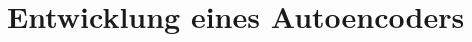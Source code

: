 \documentclass[../main]{subfiles}
\begin{document}
\section{Entwicklung eines Autoencoders}
\end{document}
